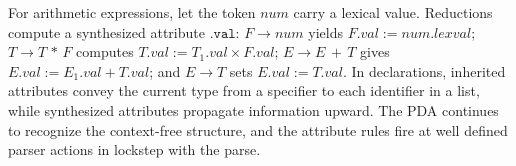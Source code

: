 For arithmetic expressions, let the token \(\textit{num}\) carry a lexical value. Reductions compute a synthesized attribute
 \(\texttt{.val}\): \(F \rightarrow \textit{num}\) yields \(F.val := \textit{num.lexval}\); \(T \rightarrow T\,*\,F\) computes 
 \(T.val := T_1.val \times F.val\); \(E \rightarrow E\,+\,T\) gives \(E.val := E_1.val + T.val\); and \(E \rightarrow T\) sets
  \(E.val := T.val\). In declarations, inherited attributes convey the current type from a specifier to each identifier in a list, while synthesized 
  attributes propagate information upward. The PDA continues to recognize the context-free structure, and the attribute rules fire at well defined 
  parser actions in lockstep with the parse.


